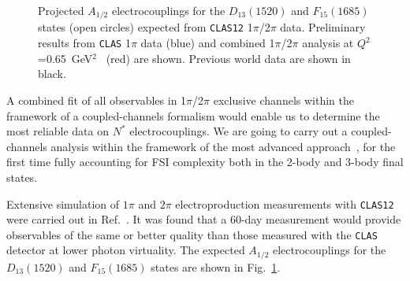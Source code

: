 \begin{figure}[htbp]
\vspace{6.0cm}
\caption{\small{Projected $A_{1/2}$ electrocouplings for the $D_{13}(1520)$
and $F_{15}(1685)$ states (open circles) expected from {\tt CLAS12} 
1$\pi$/2$\pi$ data.  Preliminary results from {\tt CLAS} 1$\pi$ data (blue) 
and combined 1$\pi$/2$\pi$ analysis at $Q^2$=0.65~GeV$^2$~\cite{Az05} (red) 
are shown. Previous world data are shown in black.}}
\label{fig:f15projection}
\end{figure}

A combined fit of all observables in 1$\pi$/2$\pi$ exclusive channels within 
the framework of a coupled-channels formalism would enable us to determine 
the most reliable data on $N^*$ electrocouplings.  We are going to carry out 
a coupled-channels analysis within the framework of the most advanced 
approach~\cite{Lee06}, for the first time fully accounting for FSI complexity 
both in the 2-body and 3-body final states.

Extensive simulation of $1\pi$ and $2\pi$ electroproduction measurements 
with {\tt CLAS12} were carried out in Ref.~\cite{Pr06}. It was found that 
a 60-day measurement would provide observables of the same or better 
quality than those measured with the {\tt CLAS} detector at lower photon
virtuality. The expected $A_{1/2}$ electrocouplings for the $D_{13}(1520)$ 
and $F_{15}(1685)$ states are shown in Fig.~\ref{fig:f15projection}.
